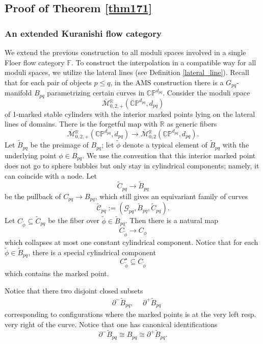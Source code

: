 \documentclass[reqno, 10pt]{amsart}
\numberwithin{equation}{section}
\numberwithin{equation}{section}
\renewcommand{\subset}{\subseteq}
\theoremstyle{definition}
\theoremstyle{remark}
\newcommand{\beqn}{\begin{equation*}}
\newcommand{\eeqn}{\end{equation*}}
\newcommand{\ov}{\overline}
\newcommand{\mb}{\mathbb}
\newcommand{\mc}{\mathcal}
\newcommand{\wt}{\widetilde}
\begin{document}
\subsection{Proof of Theorem \ref{thm171}}\label{subsection173}

\subsubsection{An extended Kuranishi flow category}

We extend the previous construction to all moduli spaces involved in a single Floer flow category ${\mb F}$. To construct the interpolation in a compatible way for all moduli spaces, we utilize the lateral lines (see Definition \ref{lateral_line}). Recall that for each pair of objects $p\leq q$, in the AMS construction there is a $G_{pq}$-manifold $B_{pq}$ parametrizing certain curves in $\mb{CP}^{d_{pq}}$. Consider the moduli space
\beqn
\ov{\mc M}{}_{0, 2, +}^{\mb R}(\mb{CP}^{d_{pq}}, d_{pq})
\eeqn
of 1-marked stable cylinders with the interior marked points lying on the lateral lines of domains. There is the forgetful map with ${\mb R}$ as generic fibers
\beqn
\ov{\mc M}{}_{0,2,+}^{\mb R}(\mb{CP}^{d_{pq}}, d_{pq}) \to \ov{\mc M}{}_{0,2}^{\mb R}(\mb{CP}^{d_{pq}}, d_{pq}).
\eeqn
Let $\wt B_{pq}$ be the preimage of $B_{pq}$; let $\wt \phi$ denote a typical element of $\wt B_{pq}$ with the underlying point $\phi \in B_{pq}$. We use the convention that this interior marked point does not go to sphere bubbles but only stay in cylindrical components; namely, it can coincide with a node. Let 
\beqn
\wt C_{pq} \to \wt B_{pq}
\eeqn
be the pullback of $C_{pq} \to B_{pq}$,  which still gives an equivariant family of curves
\beqn
\wt {\mc C}_{pq}:= ({\mc G}_{pq}, \wt B_{pq}, \wt C_{pq}).
\eeqn
Let $C_{\wt \phi} \subset \wt C_{pq}$ be the fiber over $\wt \phi \in \wt B_{pq}$. Then there is a natural map 
\beqn
C_{\wt \phi} \to C_\phi
\eeqn
which collapses at most one constant cylindrical component. Notice that for each $\wt \phi \in \wt B_{pq}$, there is a special cylindrical component
\beqn
C_{\wt \phi}^\star \subset C_{\wt \phi}
\eeqn
which contains the marked point.

Notice that there two disjoint closed subsets 
\begin{align*}
&\ \partial^- \wt B_{pq},\ &\ \partial^+ \wt B_{pq}
\end{align*}
corresponding to configurations where the marked points is at the very left resp. very right of the curve. Notice that one has canonical identifications
\beqn
\partial^- \wt B_{pq} \cong B_{pq} \cong \partial^+ \wt B_{pq}.
\eeqn
\end{document}
